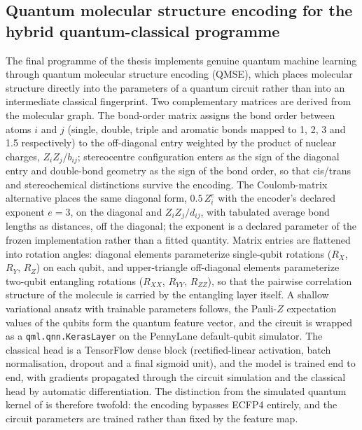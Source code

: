 \subsection{Quantum molecular structure encoding for the hybrid quantum-classical programme}\label{sec:qmse_methods}

The final programme of the thesis implements genuine quantum machine learning through quantum molecular structure encoding (QMSE)\cite{Boy2025QMSE}, which places molecular structure directly into the parameters of a quantum circuit rather than into an intermediate classical fingerprint. Two complementary matrices are derived from the molecular graph. The bond-order matrix assigns the bond order between atoms $i$ and $j$ (single, double, triple and aromatic bonds mapped to \num{1}, \num{2}, \num{3} and \num{1.5} respectively) to the off-diagonal entry weighted by the product of nuclear charges, $Z_i Z_j / b_{ij}$; stereocentre configuration enters as the sign of the diagonal entry and double-bond geometry as the sign of the bond order, so that cis/trans and stereochemical distinctions survive the encoding. The Coulomb-matrix alternative places the same diagonal form, $0.5\,Z_i^{e}$ with the encoder's declared exponent $e = \num{3}$, on the diagonal and $Z_i Z_j / d_{ij}$, with tabulated average bond lengths as distances, off the diagonal; the exponent is a declared parameter of the frozen implementation rather than a fitted quantity. Matrix entries are flattened into rotation angles: diagonal elements parameterize single-qubit rotations ($R_X$, $R_Y$, $R_Z$) on each qubit, and upper-triangle off-diagonal elements parameterize two-qubit entangling rotations ($R_{XX}$, $R_{YY}$, $R_{ZZ}$), so that the pairwise correlation structure of the molecule is carried by the entangling layer itself. A shallow variational ansatz with trainable parameters follows, the Pauli-$Z$ expectation values of the qubits form the quantum feature vector, and the circuit is wrapped as a \texttt{qml.qnn.KerasLayer} on the PennyLane default-qubit simulator. The classical head is a TensorFlow dense block (rectified-linear activation, batch normalisation, dropout and a final sigmoid unit), and the model is trained end to end, with gradients propagated through the circuit simulation and the classical head by automatic differentiation. The distinction from the simulated quantum kernel of  is therefore twofold: the encoding bypasses ECFP4 entirely, and the circuit parameters are trained rather than fixed by the feature map.

